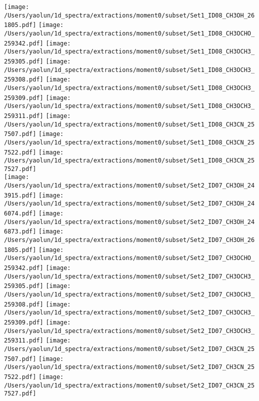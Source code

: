 \begin{figure*}[htbp!]
  \texttt{[image: /Users/yaolun/1d\_spectra/extractions/moment0/subset/Set1\_ID08\_CH3OH\_261805.pdf]}
  \texttt{[image: /Users/yaolun/1d\_spectra/extractions/moment0/subset/Set1\_ID08\_CH3OCHO\_259342.pdf]}
  \texttt{[image: /Users/yaolun/1d\_spectra/extractions/moment0/subset/Set1\_ID08\_CH3OCH3\_259305.pdf]}
  \texttt{[image: /Users/yaolun/1d\_spectra/extractions/moment0/subset/Set1\_ID08\_CH3OCH3\_259308.pdf]}
  \texttt{[image: /Users/yaolun/1d\_spectra/extractions/moment0/subset/Set1\_ID08\_CH3OCH3\_259309.pdf]}
  \texttt{[image: /Users/yaolun/1d\_spectra/extractions/moment0/subset/Set1\_ID08\_CH3OCH3\_259311.pdf]}
  \texttt{[image: /Users/yaolun/1d\_spectra/extractions/moment0/subset/Set1\_ID08\_CH3CN\_257507.pdf]}
  \texttt{[image: /Users/yaolun/1d\_spectra/extractions/moment0/subset/Set1\_ID08\_CH3CN\_257522.pdf]}
  \texttt{[image: /Users/yaolun/1d\_spectra/extractions/moment0/subset/Set1\_ID08\_CH3CN\_257527.pdf]}
  \\
  \texttt{[image: /Users/yaolun/1d\_spectra/extractions/moment0/subset/Set2\_ID07\_CH3OH\_243915.pdf]}
  \texttt{[image: /Users/yaolun/1d\_spectra/extractions/moment0/subset/Set2\_ID07\_CH3OH\_246074.pdf]}
  \texttt{[image: /Users/yaolun/1d\_spectra/extractions/moment0/subset/Set2\_ID07\_CH3OH\_246873.pdf]}
  \texttt{[image: /Users/yaolun/1d\_spectra/extractions/moment0/subset/Set2\_ID07\_CH3OH\_261805.pdf]}
  \texttt{[image: /Users/yaolun/1d\_spectra/extractions/moment0/subset/Set2\_ID07\_CH3OCHO\_259342.pdf]}
  \texttt{[image: /Users/yaolun/1d\_spectra/extractions/moment0/subset/Set2\_ID07\_CH3OCH3\_259305.pdf]}
  \texttt{[image: /Users/yaolun/1d\_spectra/extractions/moment0/subset/Set2\_ID07\_CH3OCH3\_259308.pdf]}
  \texttt{[image: /Users/yaolun/1d\_spectra/extractions/moment0/subset/Set2\_ID07\_CH3OCH3\_259309.pdf]}
  \texttt{[image: /Users/yaolun/1d\_spectra/extractions/moment0/subset/Set2\_ID07\_CH3OCH3\_259311.pdf]}
  \texttt{[image: /Users/yaolun/1d\_spectra/extractions/moment0/subset/Set2\_ID07\_CH3CN\_257507.pdf]}
  \texttt{[image: /Users/yaolun/1d\_spectra/extractions/moment0/subset/Set2\_ID07\_CH3CN\_257522.pdf]}
  \texttt{[image: /Users/yaolun/1d\_spectra/extractions/moment0/subset/Set2\_ID07\_CH3CN\_257527.pdf]}

\end{figure*}
